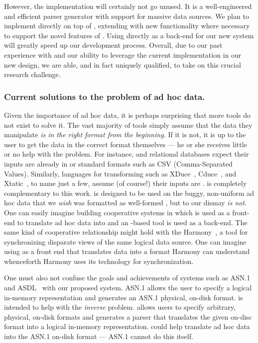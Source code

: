 \documentclass[11pt]{article}
\begin{document}
However, the \pads{} implementation will certainly not go unused.  It 
is a well-engineered
and efficient parser generator with support for massive data sources.
We plan to implement \datatype{} directly on top of \pads{}, extending \pads{}
with new functionality where necessary to support the novel features 
of \datatype.  Using \pads{} directly as a back-end for our
new system will greatly speed up our development process.
Overall, due to our past experience with \pads{} and
our ability to leverage the current implementation in our new design,
we are able, and in fact uniquely qualified, to take on this crucial
research challenge.

\subsubsection{Current solutions to the problem of ad hoc data.}

Given the importance of ad hoc data, it is perhaps surprising that
more tools do not exist to solve it.  The vast majority of tools simply assume
that the data they manipulate {\em is in the right format from the
beginning.}  If it is not, it is up to the user to get the data in the
correct format themselves --- he or she receives little or no help
with the problem.  For instance, \xml{} and relational databases expect
their inputs are already in \xml{} or standard formats such as CSV
(Comma-Separated Values).  Similarly, languages for transforming
\xml{} such as XDuce~\cite{hosoya+:xduce-journal}, 
Cduce~\cite{benzaken+:cduce}, and 
Xtatic~\cite{gapeyev+:XtaticRuntime}, to name just a few,
assume (of course!) their inputs are \xml.
\datatype{} is completely complementary to this work.
\datatype{} is designed to be used on the buggy, non-uniform
ad hoc data that we {\em wish} was formatted as well-formed 
\xml, but to our dismay {\em is not}.
One can easily imagine building cooperative systems 
in which \datatype{} is used as a front-end to translate
ad hoc data into \xml{} and an \xml-based tool is used as a back-end.
The same kind of cooperative relationship might hold with the 
Harmony~\cite{foster+:lenses}, a tool for synchronizing 
disparate views of the same logical data source.  One can 
imagine using \datatype{} as a front end that translates data into 
a format Harmony can understand whenceforth Harmony uses
its technology for synchronization.  

One must also not confuse the goals and achievements of systems such as
ASN.1~\cite{asn} and ASDL~\cite{asdl} with our proposed 
\datatype{} system.  ASN.1 
allows the user to specify a logical in-memory
representation and generates an ASN.1 physical, on-disk format. 
\datatype{} is intended to help with the {\em inverse} problem.
\datatype{} allows users to specify arbitrary, physical, on-disk 
formats and generates
a parser that translates the given on-disc format into a 
logical in-memory representation.  \datatype{} could help translate
ad hoc data into the ASN.1 on-disk format --- ASN.1 cannot do this
itself.
\end{document}
